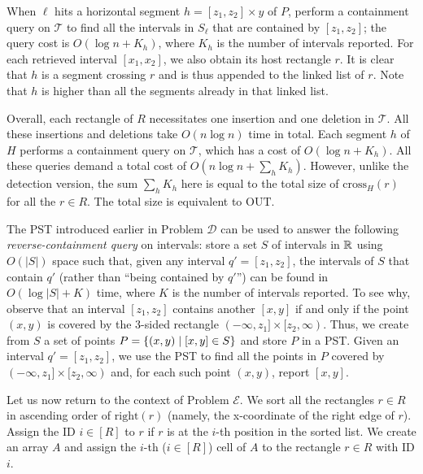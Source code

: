 \documentclass[sigconf]{acmart}
\def\vgap{\vspace{0mm}}
\def\extraspacing{\vspace{1.5mm} \noindent}
\def\T{\mathcal{T}}
\def\xright{\mathrm{right}}
\def\cross{\mathrm{cross}}
\def\out{\mathrm{OUT}}
\begin{document}
{{{\vgap

When $\ell$ hits a horizontal segment $h = [z_1, z_2] \times y$ of $P$, perform a containment query on $\T$ to find all the intervals in $S_\ell$ that are contained by $[z_1, z_2]$; the query cost is $O(\log n + K_h)$, where $K_h$ is the number of intervals reported. For each retrieved interval $[x_1, x_2]$, we also obtain its host rectangle $r$. It is clear that $h$ is a segment crossing $r$ and is thus appended to the linked list of $r$. Note that $h$ is higher than all the segments already in that linked list.

\vgap

Overall, each rectangle of $R$ necessitates one insertion and one deletion in $\T$. All these insertions and deletions take $O(n \log n)$ time in total. Each segment $h$ of $H$ performs a containment query on $\T$, which has a cost of $O(\log n + K_h)$. All these queries demand a total cost of $O(n \log n + \sum_h K_h)$. However, unlike the detection version, the sum $\sum_h K_h$ here is equal to the total size of $\cross_H(r)$ for all the $r \in R$. The total size is equivalent to $\out$.


\extraspacing {\bf Algorithm for Problem $\bm{\mathscr{E}}$.} The PST introduced earlier in Problem $\mathscr{D}$ can be used to answer the following {\em reverse-containment query} on intervals: store a set $S$ of intervals in $\mathbb{R}$ using $O(|S|)$ space such that, given any interval $q' = [z_1, z_2]$, the intervals of $S$ that contain  $q'$ (rather than ``being contained by $q'$'') can be found in $O(\log |S| + K)$ time, where $K$ is the number of intervals reported. To see why, observe that an interval $[z_1, z_2]$ contains another $[x, y]$ if and only if the point $(x, y)$ is covered by the 3-sided rectangle $(-\infty, z_1] \times [z_2, \infty)$. Thus, we create from $S$ a set of points $P = \{(x, y) \mid [x, y] \in S\}$ and store $P$ in a PST. Given an interval $q' = [z_1, z_2]$, we use the PST to find all the points in $P$ covered by $(-\infty, z_1] \times [z_2, \infty)$ and, for each such point $(x, y)$, report $[x, y]$.

\vgap

Let us now return to the context of Problem $\mathscr{E}$. We sort all the rectangles $r \in R$ in ascending order of $\xright(r)$ (namely, the x-coordinate of the right edge of $r$). Assign the ID $i \in [R]$ to $r$ if $r$ is at the $i$-th position in the sorted list. We create an array $A$ and assign the $i$-th ($i \in [R]$) cell of $A$ to the rectangle $r \in R$ with ID $i$.

}}}
\end{document}

